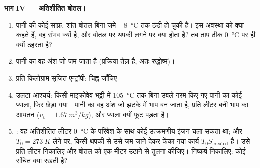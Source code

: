 \begin{problem}
\medskip
\noindent\textbf{भाग IV --- अतिशीतित बोतल।}
\begin{enumerate}[resume]
  \item पानी की कोई साफ़, शांत बोतल बिना जमे \qty{-8}{\degreeCelsius} तक
        ठंडी हो चुकी है। इस अवस्था को क्या कहते हैं, वह संभव क्यों है, और
        बोतल पर थपकी लगने पर क्या होता है? तब ताप ठीक
        \qty{0}{\degreeCelsius} पर ही क्यों ठहरता है?
  \item पानी का वह अंश जो जम जाता है (प्रक्रिया तेज़ है, अतः रुद्धोष्म)।
  \item प्रति किलोग्राम सृजित एन्ट्रॉपी; चिह्न जाँचिए।
  \item उलटा आश्चर्य: किसी माइक्रोवेव भट्ठी में \qty{105}{\degreeCelsius}
        तक बिना उबले गरम किए गए पानी का कोई प्याला, फिर छेड़ा गया। पानी का
        वह अंश जो झटके में भाप बन जाता है, प्रति लीटर बनी भाप का आयतन
        ($v_v = \qty{1.67}{m^3/kg}$), और प्याला क्यों फूट पड़ता है।
  \item {}: वह अतिशीतित लीटर \qty{0}{\degreeCelsius} के परिवेश के
        साथ कोई उत्क्रमणीय इंजन चला सकता था; और
        $T_0 = \qty{273}{K}$ लेने पर, किसी थपकी से उसे जम जाने देकर फेंका
        गया कार्य $T_0S_{\mathrm{created}}$ है। उसे प्रति लीटर निकालिए और
        बोतल को एक मीटर उठाने से तुलना कीजिए। निष्कर्ष निकालिए: कोई
         संचित क्या रखती है?
\end{enumerate}
\end{problem}

